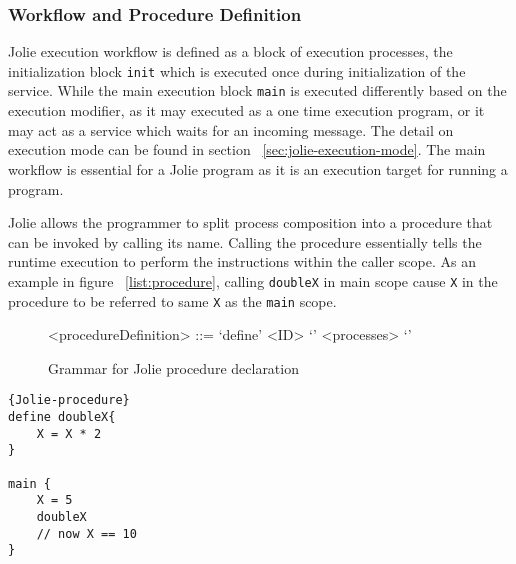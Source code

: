 \subsubsection{Workflow and Procedure Definition}
\label{sec:jolie-procedure-def}

Jolie execution workflow is defined as a block of execution processes, the initialization block \texttt{init} which is executed once during initialization of the service. While the main execution block \texttt{main} is executed differently based on the execution modifier, as it may executed as a one time execution program, or it may act as a service which waits for an incoming message. The detail on execution mode can be found in section ~\ref{sec:jolie-execution-mode}. The main workflow is essential for a Jolie program as it is an execution target for running a program.

Jolie allows the programmer to split process composition into a procedure that can be invoked by calling its name. Calling the procedure essentially tells the runtime execution to perform the instructions within the caller scope. As an example in figure ~\ref{list:procedure}, calling \texttt{doubleX} in main scope cause \texttt{X} in the procedure to be referred to same \texttt{X} as the \texttt{main} scope. 

\begin{figure}[]
	\begin{framed}
		\begin{grammar}
			<procedureDefinition> ::= `define' <ID> `{' <processes> `}'
		\end{grammar}
	\end{framed}
	\caption{Grammar for Jolie procedure declaration}
\end{figure}


\begin{listing}[]
\lstset{language=Jolie,
	style=codeStyle
}
\begin{lstlisting}[frame=tlrb]{Jolie-procedure}
define doubleX{
	X = X * 2
}

main {
	X = 5
	doubleX
	// now X == 10
}
\end{lstlisting}
\caption{Jolie implementation of procedure calling}
\label{list:procedure}
\end{listing}

\FloatBarrier
